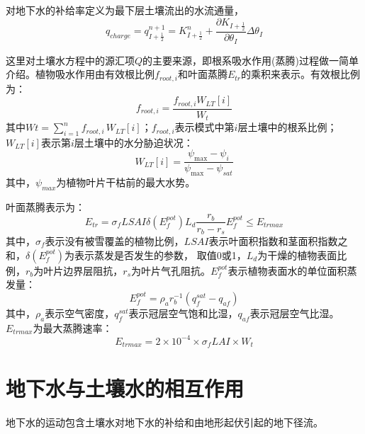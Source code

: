 对地下水的补给率定义为最下层土壤流出的水流通量，
\begin{equation}
{q}_{ {charge }}=q_{I+\frac{1}{2}}^{n+1}=K_{I+\frac{1}{2}}^{n}+\frac{\partial K_{I+\frac{1}{2}}}{\partial \theta_{I}} \Delta \theta_{I}
\end{equation}


这里对土壤水方程中的源汇项$Q$的主要来源，即根系吸水作用(蒸腾)过程做一简单介绍。植物吸水作用由有效根比例$f_{root,i}$和叶面蒸腾$E_{tr}$的乘积来表示\citep{dai2003common}。有效根比例为：
\begin{equation}
{f}_{ {root }, {i}}=\frac{{f}_{{root}, {i}} {W}_{{LT}}[{i}]}{W_{t}}
\end{equation}
其中$Wt = \sum_{i=1}^{n}{f_{root,i\ }W_{LT}\left[i\right]}$；$f_{root,i}$表示模式中第$i$层土壤中的根系比例；$W_{LT}[i]$表示第$i$层土壤中的水分胁迫状况：
\begin{equation}
{W}_{{LT}}[{i}]=\frac{\psi_{\max }-\psi_{i}}{\psi_{\max }-\psi_{sat}}
\end{equation}
其中，$\psi_{max}$为植物叶片干枯前的最大水势。


叶面蒸腾表示为：
\begin{equation}
{E}_{{tr}}=\sigma_{{f}} LSAI \delta\left({E}_{{f}}^{{pot}}\right) {L}_{{d}} \frac{{r}_{{b}}}{{r}_{{b}}-{r}_{{s}}} {E}_{{f}}^{{pot}} \leq {E}_{{trmax}}
\end{equation}
其中，$\sigma_f$表示没有被雪覆盖的植物比例，$LSAI$表示叶面积指数和茎面积指数之和，$\delta\left(E_f^{pot}\right)$为表示蒸发是否发生的参数，
取值0或1，$L_d$为干燥的植物表面比例，$r_b$为叶片边界层阻抗，$r_s$为叶片气孔阻抗。$E_f^{pot}$表示植物表面水的单位面积蒸发量：
\begin{equation}
{E}_{{f}}^{{pot}}=\rho_{{a}} {r}_{{b}}^{-1}\left({q}_{{f}}^{{sat}}-{q}_{{af}}\right)
\end{equation}
其中，$\rho_a$表示空气密度，$q_f^{sat}$表示冠层空气饱和比湿，$q_{af}$表示冠层空气比湿。$E_{trmax}$为最大蒸腾速率：
\begin{equation}
{E}_{ {trmax }}=2 \times 10^{-4} \times \sigma_{{f}} L A I \times W_{t}
\end{equation}
\section{地下水与土壤水的相互作用}
地下水的运动包含土壤水对地下水的补给和由地形起伏引起的地下径流。



